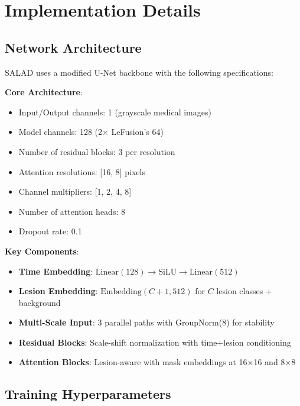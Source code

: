 \documentclass[10pt,twocolumn,letterpaper]{article}
\begin{document}



\appendix

\section{Implementation Details}
\label{app:implementation}

\subsection{Network Architecture}

SALAD uses a modified U-Net backbone with the following specifications:

\textbf{Core Architecture}:
\begin{itemize}
    \item Input/Output channels: 1 (grayscale medical images)
    \item Model channels: 128 (2× LeFusion's 64)
    \item Number of residual blocks: 3 per resolution
    \item Attention resolutions: [16, 8] pixels
    \item Channel multipliers: [1, 2, 4, 8]
    \item Number of attention heads: 8
    \item Dropout rate: 0.1
\end{itemize}

\textbf{Key Components}:
\begin{itemize}
    \item \textbf{Time Embedding}: $\text{Linear}(128) \rightarrow \text{SiLU} \rightarrow \text{Linear}(512)$
    \item \textbf{Lesion Embedding}: $\text{Embedding}(C+1, 512)$ for $C$ lesion classes + background
    \item \textbf{Multi-Scale Input}: 3 parallel paths with GroupNorm(8) for stability
    \item \textbf{Residual Blocks}: Scale-shift normalization with time+lesion conditioning
    \item \textbf{Attention Blocks}: Lesion-aware with mask embeddings at 16×16 and 8×8
\end{itemize}

\subsection{Training Hyperparameters}
\end{document}
